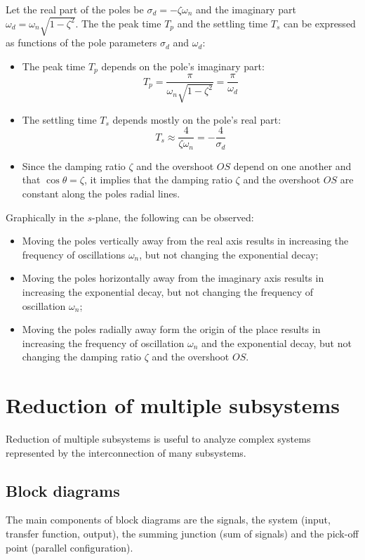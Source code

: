\documentclass[10pt, twocolumn]{article}
\begin{document}
Let the real part of the poles be \(\sigma_d = - \zeta \omega_n\) and the imaginary part \(\omega_d = \omega_n \sqrt{1 - \zeta^2}\).
The the peak time \(T_p\) and the settling time \(T_s\) can be expressed as functions of the pole parameters \(\sigma_d\) and \(\omega_d\):
\begin{itemize}
  \item The peak time \(T_p\) depends on the pole's imaginary part:
        \[
          T_p = \frac{\pi}{\omega_n \sqrt{1 - \zeta^2}} = \frac{\pi}{\omega_d}
        \]
  \item The settling time \(T_s\) depends mostly on the pole's real part:
        \[
          T_s \approx \frac{4}{\zeta\omega_n} = -\frac{4}{\sigma_d}
        \]
  \item Since the damping ratio \(\zeta\) and the overshoot \(OS\) depend on one another and that \(\cos\theta = \zeta\), it implies that the damping ratio \(\zeta\) and the overshoot \(OS\) are constant along the poles radial lines.
\end{itemize}

Graphically in the \(s\)-plane, the following can be observed:
\begin{itemize}
  \item Moving the poles vertically away from the real axis results in increasing the frequency of oscillations \(\omega_n\), but not changing the exponential decay;
  \item Moving the poles horizontally away from the imaginary axis results in increasing the exponential decay, but not changing the frequency of oscillation \(\omega_n\);
  \item Moving the poles radially away form the origin of the place results in increasing the frequency of oscillation \(\omega_n\) and the exponential decay, but not changing the damping ratio \(\zeta\) and the overshoot \(OS\).
\end{itemize}


\section{Reduction of multiple subsystems}
Reduction of multiple subsystems is useful to analyze complex systems represented by the interconnection of many subsystems.


\subsection{Block diagrams}
The main components of block diagrams are the signals, the system (input, transfer function, output), the summing junction (sum of signals) and the pick-off point (parallel configuration).
\end{document}
